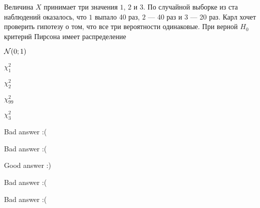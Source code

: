 
\begin{question}
Величина \(X\) принимает три значения \(1\), \(2\) и \(3\). По случайной
выборке из ста наблюдений оказалось, что \(1\) выпало 40 раз, \(2\) ---
40 раз и \(3\) --- 20 раз. Карл хочет проверить гипотезу о том, что все
три вероятности одинаковые. При верной \(H_0\) критерий Пирсона имеет
распределение
\begin{answerlist}
  \item \(\mathcal{N}(0;1)\)
  \item \(\chi^2_1\)
  \item \(\chi^2_2\)
  \item \(\chi^2_{99}\)
  \item \(\chi^2_3\)
\end{answerlist}
\end{question}

\begin{solution}
\begin{answerlist}
  \item Bad answer :(
  \item Bad answer :(
  \item Good answer :)
  \item Bad answer :(
  \item Bad answer :(
\end{answerlist}
\end{solution}

